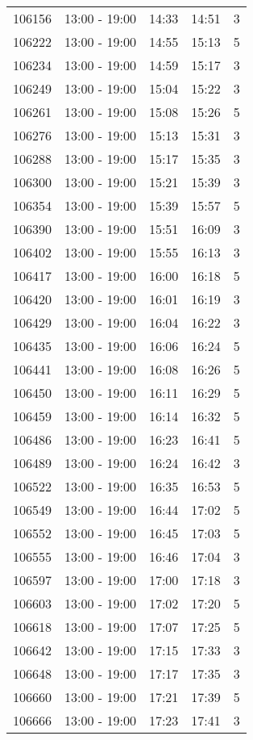 \documentclass{article}
\begin{document}
\begin{tabular}{llccc}
106156 & 13:00 - 19:00 & 14:33 & 14:51 & 3 \\
106222 & 13:00 - 19:00 & 14:55 & 15:13 & 5 \\
106234 & 13:00 - 19:00 & 14:59 & 15:17 & 3 \\
106249 & 13:00 - 19:00 & 15:04 & 15:22 & 3 \\
106261 & 13:00 - 19:00 & 15:08 & 15:26 & 5 \\
106276 & 13:00 - 19:00 & 15:13 & 15:31 & 3 \\
106288 & 13:00 - 19:00 & 15:17 & 15:35 & 3 \\
106300 & 13:00 - 19:00 & 15:21 & 15:39 & 3 \\
106354 & 13:00 - 19:00 & 15:39 & 15:57 & 5 \\
106390 & 13:00 - 19:00 & 15:51 & 16:09 & 3 \\
106402 & 13:00 - 19:00 & 15:55 & 16:13 & 3 \\
106417 & 13:00 - 19:00 & 16:00 & 16:18 & 5 \\
106420 & 13:00 - 19:00 & 16:01 & 16:19 & 3 \\
106429 & 13:00 - 19:00 & 16:04 & 16:22 & 3 \\
106435 & 13:00 - 19:00 & 16:06 & 16:24 & 5 \\
106441 & 13:00 - 19:00 & 16:08 & 16:26 & 5 \\
106450 & 13:00 - 19:00 & 16:11 & 16:29 & 5 \\
106459 & 13:00 - 19:00 & 16:14 & 16:32 & 5 \\
106486 & 13:00 - 19:00 & 16:23 & 16:41 & 5 \\
106489 & 13:00 - 19:00 & 16:24 & 16:42 & 3 \\
106522 & 13:00 - 19:00 & 16:35 & 16:53 & 5 \\
106549 & 13:00 - 19:00 & 16:44 & 17:02 & 5 \\
106552 & 13:00 - 19:00 & 16:45 & 17:03 & 5 \\
106555 & 13:00 - 19:00 & 16:46 & 17:04 & 3 \\
106597 & 13:00 - 19:00 & 17:00 & 17:18 & 3 \\
106603 & 13:00 - 19:00 & 17:02 & 17:20 & 5 \\
106618 & 13:00 - 19:00 & 17:07 & 17:25 & 5 \\
106642 & 13:00 - 19:00 & 17:15 & 17:33 & 3 \\
106648 & 13:00 - 19:00 & 17:17 & 17:35 & 3 \\
106660 & 13:00 - 19:00 & 17:21 & 17:39 & 5 \\
106666 & 13:00 - 19:00 & 17:23 & 17:41 & 3 \\

\end{tabular}
\end{document}
